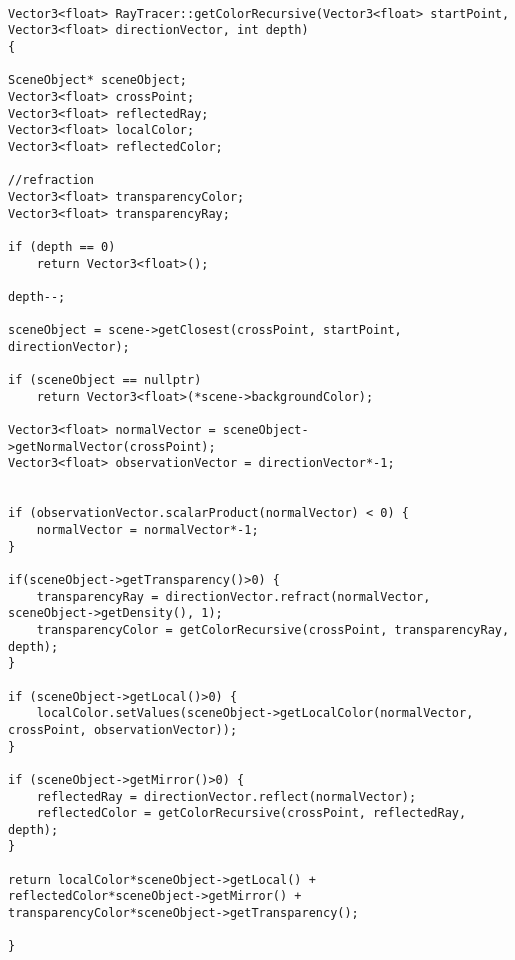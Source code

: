 \begin{lstlisting}

Vector3<float> RayTracer::getColorRecursive(Vector3<float> startPoint, Vector3<float> directionVector, int depth)
{

SceneObject* sceneObject;
Vector3<float> crossPoint;
Vector3<float> reflectedRay;
Vector3<float> localColor;
Vector3<float> reflectedColor;

//refraction
Vector3<float> transparencyColor;
Vector3<float> transparencyRay;

if (depth == 0)
    return Vector3<float>();

depth--;

sceneObject = scene->getClosest(crossPoint, startPoint, directionVector);

if (sceneObject == nullptr)
    return Vector3<float>(*scene->backgroundColor);

Vector3<float> normalVector = sceneObject->getNormalVector(crossPoint);
Vector3<float> observationVector = directionVector*-1;


if (observationVector.scalarProduct(normalVector) < 0) {
    normalVector = normalVector*-1;
}

if(sceneObject->getTransparency()>0) {
    transparencyRay = directionVector.refract(normalVector, sceneObject->getDensity(), 1);
    transparencyColor = getColorRecursive(crossPoint, transparencyRay, depth);
}

if (sceneObject->getLocal()>0) {
    localColor.setValues(sceneObject->getLocalColor(normalVector, crossPoint, observationVector));
}

if (sceneObject->getMirror()>0) {
    reflectedRay = directionVector.reflect(normalVector);
    reflectedColor = getColorRecursive(crossPoint, reflectedRay, depth);
}

return localColor*sceneObject->getLocal() + reflectedColor*sceneObject->getMirror() + transparencyColor*sceneObject->getTransparency();

}

\end{lstlisting}
	
